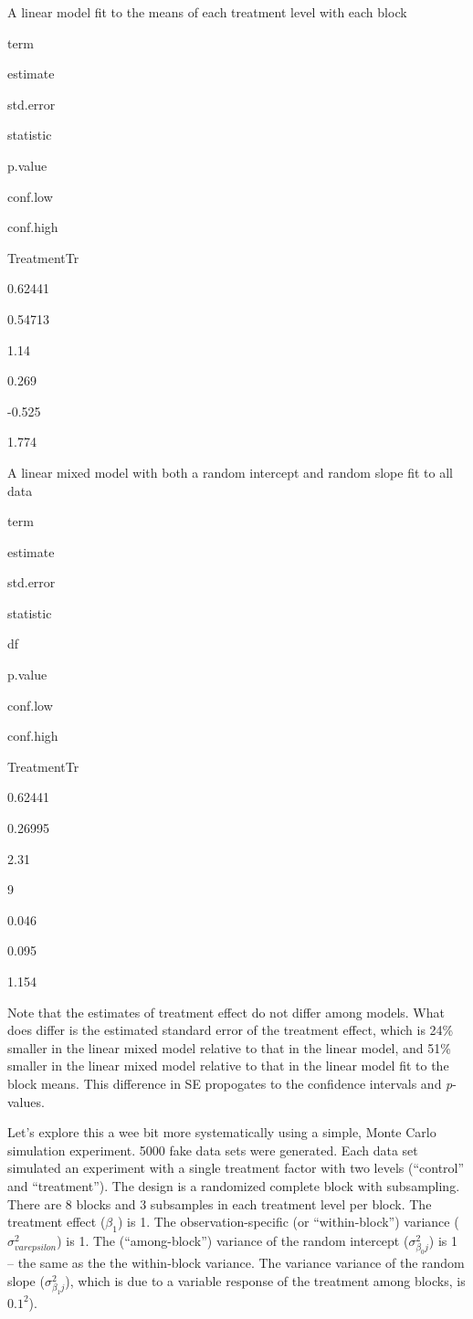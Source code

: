 \documentclass[]{book}
\begin{document}
A linear model fit to the means of each treatment level with each block

term

estimate

std.error

statistic

p.value

conf.low

conf.high

TreatmentTr

0.62441

0.54713

1.14

0.269

-0.525

1.774

A linear mixed model with both a random intercept and random slope fit to all data

term

estimate

std.error

statistic

df

p.value

conf.low

conf.high

TreatmentTr

0.62441

0.26995

2.31

9

0.046

0.095

1.154

Note that the estimates of treatment effect do not differ among models. What does differ is the estimated standard error of the treatment effect, which is 24\% smaller in the linear mixed model relative to that in the linear model, and 51\% smaller in the linear mixed model relative to that in the linear model fit to the block means. This difference in SE propogates to the confidence intervals and \emph{p}-values.

Let's explore this a wee bit more systematically using a simple, Monte Carlo simulation experiment. 5000 fake data sets were generated. Each data set simulated an experiment with a single treatment factor with two levels (``control'' and ``treatment''). The design is a randomized complete block with subsampling. There are 8 blocks and 3 subsamples in each treatment level per block. The treatment effect (\(\beta_1\)) is 1. The observation-specific (or ``within-block'') variance (\(\sigma^2_{varepsilon}\)) is 1. The (``among-block'') variance of the random intercept (\(\sigma^2_{\beta_0j}\)) is 1 -- the same as the the within-block variance. The variance variance of the random slope (\(\sigma^2_{\beta_1j}\)), which is due to a variable response of the treatment among blocks, is \(0.1^2\)).
\end{document}
